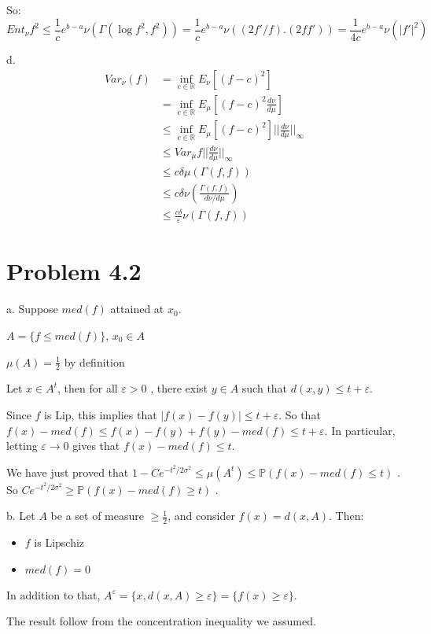 \documentclass[11pt]{article}
\begin{document}
So:
$$Ent_{\nu} f^2 \le \frac1c e^{b-a} \nu(\Gamma(\log f^2, f^2)) = \frac1c e^{b-a} \nu( (2f'/f). (2f f')) = \frac1{4c}e^{b-a} \nu( |f'|^2)$$

d.
\begin{align*}
Var_{\nu}(f) &= \inf_{c \in \mathbb R} E_{\nu}[(f - c)^2]
\\&= \inf_{c \in \mathbb R} E_{\mu}[(f - c)^2 \frac{d\nu}{d\mu}]
\\&\le \inf_{c \in \mathbb R} E_{\mu}[(f - c)^2] ||\frac{d\nu}{d\mu}||_{\infty}
\\&\le  Var_{\mu} f ||\frac{d\nu}{d\mu}||_{\infty}
\\&\le c \delta \mu(\Gamma(f, f)) 
\\&\le c \delta\nu(\frac{\Gamma(f, f)}{d\nu/d\mu}) 
\\&\le \frac{c\delta}{\varepsilon} \nu(\Gamma(f, f)) 
\end{align*}

\section{Problem 4.2}
\label{sec:orgheadline3}
a. Suppose \(med(f)\) attained at \(x_0\).

\(A = \{f \le med(f)\}\), \(x_0 \in A\)

\(\mu(A) = \frac12\) by definition

Let \(x \in A^{t}\), then for all \(\varepsilon > 0\) , there exist \(y \in A\) such that \(d(x, y) \le t + \varepsilon\).

Since \(f\) is Lip, this implies that \(|f(x) - f(y)| \le t + \varepsilon\). So that \(f(x) - med(f) \le f(x) - f(y) + f(y) - med(f) \le t + \varepsilon\). 
In particular, letting \(\varepsilon \rightarrow 0\) gives that \(f(x) - med(f) \le t\).

We have just proved that \(1 - Ce^{-t^2/2\sigma^2} \le \mu(A^t) \le \mathbb P(f(x) - med(f) \le t)\) .
So \(Ce^{-t^2/2\sigma^2} \ge \mathbb P(f(x) - med(f) \ge t)\) .

b. Let \(A\) be a set of measure \(\ge \frac12\), and consider \(f(x) = d(x, A)\). Then:
\begin{itemize}
\item \(f\) is Lipschiz
\item \(med(f) = 0\)
\end{itemize}


In addition to that, \(A^{\varepsilon} = \{x, d(x, A) \ge \varepsilon \} = \{ f(x) \ge \varepsilon \}\).

The result follow from the concentration inequality we assumed.
\end{document}
